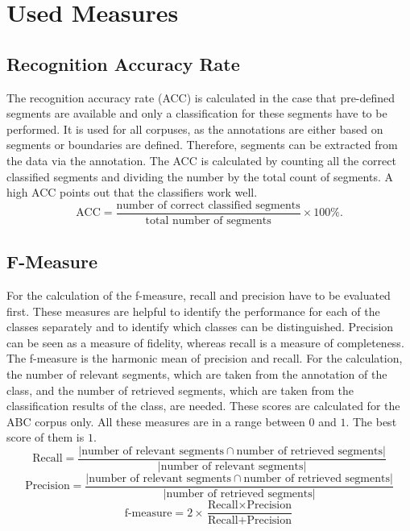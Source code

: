 \chapter{Used Measures}
\section{Recognition Accuracy Rate}
The recognition accuracy rate (ACC) is calculated in the case that pre-defined segments are available and only a classification for these segments have to be performed. It is used for all corpuses, as the annotations are either based on segments or boundaries are defined. Therefore, segments can be extracted from the data via the annotation. The ACC is calculated by counting all the correct classified segments and dividing the number by the total count of segments. A high ACC points out that the classifiers work well.
\begin{equation*}
	\textrm{ACC} = \frac{\textrm{number of correct classified segments}}{\textrm{total number of segments}} \times 100\%.
\end{equation*}

\section{F-Measure}
For the calculation of the f-measure, recall and precision have to be evaluated first. These measures are helpful to identify the performance for each of the classes separately and to identify which classes can be distinguished. Precision can be seen as a measure of fidelity, whereas recall is a measure of completeness. The f-measure is the harmonic mean of precision and recall. For the calculation, the number of relevant segments, which are taken from the annotation of the class, and the number of retrieved segments, which are taken from the classification results of the class, are needed. These scores are calculated for the ABC corpus only. All these measures are in a range between $0$ and $1$. The best score of them is $1$.
\begin{equation*}
	\textrm{Recall}=\frac{\left| \textrm{number of relevant segments} \cap \textrm{number of retrieved segments} \right|}{\left| \textrm{number of relevant segments} \right|}
\end{equation*}
\begin{equation*}
	\textrm{Precision}=\frac{\left| \textrm{number of relevant segments} \cap \textrm{number of retrieved segments} \right|}{\left| \textrm{number of retrieved segments} \right|}
\end{equation*}
\begin{equation*}
	\textrm{f-measure}=2 \times \frac{\textrm{Recall} \times \textrm{Precision}}{\textrm{Recall}+\textrm{Precision}}
\end{equation*}

